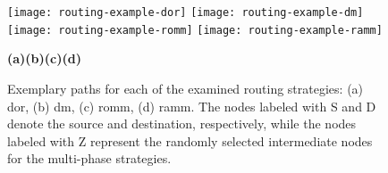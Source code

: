 \begin{figure}
    \texttt{[image: routing-example-dor]}\hfill
    \texttt{[image: routing-example-dm]}\hfill
    \texttt{[image: routing-example-romm]}\hfill
    \texttt{[image: routing-example-ramm]}\\
    \vspace{0.5\baselineskip}
    \begin{footnotesize}
        \hspace*{0.08\textwidth}\textbf{(a)}\hfill\textbf{(b)}\hfill\textbf{(c)}\hfill\textbf{(d)}\hspace*{0.08\textwidth}
    \end{footnotesize}
    \caption[Exemplary paths for various routing strategies]{Exemplary paths for each of the examined routing strategies: (a) \gls{dor}, (b)
    \gls{dm}, (c) \gls{romm}, (d) \gls{ramm}. The nodes labeled with S and D denote the source and destination, respectively, while the nodes labeled
    with Z represent the randomly selected intermediate nodes for the multi-phase strategies.}
    \label{fig:allstrategiespaths}
\end{figure}
